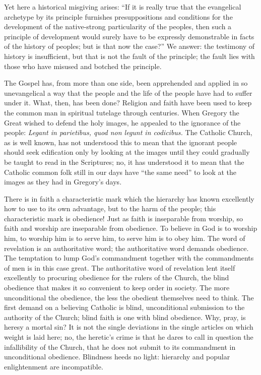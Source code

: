 \documentclass[12pt]{book}
\newcommand{\opage}[1]{\marginnote{\footnotesize\textit{[#1]}}}
\begin{document}
Yet here a historical misgiving arises: ``If it is really true that the
evangelical archetype by its principle furnishes presuppositions and
conditions for the development of the native-strong particularity of the
peoples, then such a principle of development would surely have to be
\opage{124}\setcounter{footnote}{0}%
expressly demonstrable in facts of the history of peoples; but is that
now the case?'' We answer: the testimony of history is insufficient, but
that is not the fault of the principle; the fault lies with those who
have misused and botched the principle.

The Gospel has, from more than one side, been apprehended and applied in
so unevangelical a way that the people and the life of the people have
had to suffer under it. What, then, has been done? Religion and faith
have been used to keep the common man in spiritual tutelage through
centuries. When Gregory the Great wished to defend the holy images, he
appealed to the ignorance of the people:
\textit{Legant in parietibus, quod non legunt in codicibus.} The Catholic
Church, as is well known, has not understood this to mean that the
ignorant people should seek edification only by looking at the images
until they could gradually be taught to read in the Scriptures; no, it
has understood it to mean that the Catholic common folk still in our
days have ``the same need'' to look at the images as they had in
Gregory's days.

There is in faith a characteristic mark which the hierarchy has known
excellently how to use to its own advantage, but to the harm of the
people; this characteristic mark is obedience! Just as faith is
inseparable from worship, so faith and worship are inseparable from
obedience. To believe in God is to worship him, to worship him is to
serve him, to serve him is to obey him. The word of revelation is an
authoritative word; the authoritative word demands obedience. The
temptation to lump God's commandment together with the commandments of
men is in this case great. The authoritative word of revelation lent
itself excellently to procuring obedience for the rulers of the Church,
the blind obedience that makes it so convenient to keep order in
society. The more unconditional the obedience, the less the obedient
themselves need to
\opage{125}\setcounter{footnote}{0}%
think. The first demand on a believing Catholic is blind, unconditional
submission to the authority of the Church; blind faith is one with
blind obedience. Why, pray, is heresy a mortal sin? It is not the single
deviations in the single articles on which weight is laid here; no, the
heretic's crime is that he dares to call in question the infallibility
of the Church, that he does not submit to its commandment in
unconditional obedience. Blindness heeds no light: hierarchy and popular
enlightenment are incompatible.
\end{document}
